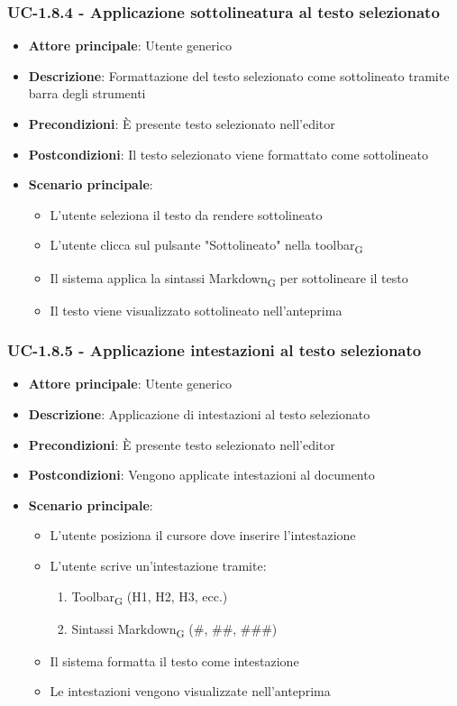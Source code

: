 \documentclass[11pt,a4paper]{article}
\newcommand{\gls}[1]{#1\textsubscript{G}}
\begin{document}
\subsubsection{UC-1.8.4 - Applicazione sottolineatura al testo selezionato}
\begin{itemize}
    \item \textbf{Attore principale}: Utente generico
    \item \textbf{Descrizione}: Formattazione del testo selezionato come sottolineato tramite barra degli strumenti
    \item \textbf{Precondizioni}: È presente testo selezionato nell'editor
    \item \textbf{Postcondizioni}: Il testo selezionato viene formattato come sottolineato
    \item \textbf{Scenario principale}:
        \begin{itemize}
            \item L'utente seleziona il testo da rendere sottolineato
            \item L'utente clicca sul pulsante "Sottolineato" nella \gls{toolbar}
            \item Il sistema applica la sintassi \gls{Markdown} per sottolineare il testo
            \item Il testo viene visualizzato sottolineato nell'anteprima
        \end{itemize}
\end{itemize}

\subsubsection{UC-1.8.5 - Applicazione intestazioni al testo selezionato}
\begin{itemize}
    \item \textbf{Attore principale}: Utente generico
    \item \textbf{Descrizione}: Applicazione di intestazioni al testo selezionato
    \item \textbf{Precondizioni}: È presente testo selezionato nell’editor
    \item \textbf{Postcondizioni}: Vengono applicate intestazioni al documento
    \item \textbf{Scenario principale}:
        \begin{itemize}
            \item L'utente posiziona il cursore dove inserire l'intestazione
            \item L'utente scrive un'intestazione tramite:
                \begin{enumerate}
                    \item \gls{Toolbar} (H1, H2, H3, ecc.)
                    \item Sintassi \gls{Markdown} (\#, \#\#, \#\#\#)
                \end{enumerate}
            \item Il sistema formatta il testo come intestazione
            \item Le intestazioni vengono visualizzate nell'anteprima
        \end{itemize}
\end{itemize}
\end{document}
